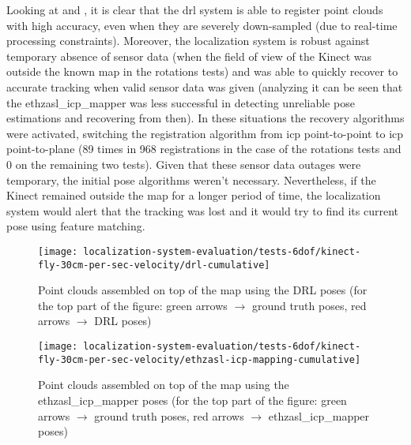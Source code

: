 Looking at  and , it is clear that the \gls{drl} system is able to register point clouds with high accuracy, even when they are severely down-sampled (due to real-time processing constraints). Moreover, the localization system is robust against temporary absence of sensor data (when the field of view of the Kinect was outside the known map in the rotations tests) and was able to quickly recover to accurate tracking when valid sensor data was given (analyzing  it can be seen that the ethzasl\_icp\_mapper was less successful in detecting unreliable pose estimations and recovering from then). In these situations the recovery algorithms were activated, switching the registration algorithm from \gls{icp} point-to-point to \gls{icp} point-to-plane (89 times in 968 registrations in the case of the rotations tests and 0 on the remaining two tests). Given that these sensor data outages were temporary, the initial pose algorithms weren't necessary. Nevertheless, if the Kinect remained outside the map for a longer period of time, the localization system would alert that the tracking was lost and it would try to find its current pose using feature matching.

\begin{figure}[H]
	\centering
	\texttt{[image: localization-system-evaluation/tests-6dof/kinect-fly-30cm-per-sec-velocity/drl-cumulative]}
	\caption{Point clouds assembled on top of the map using the DRL poses (for the top part of the figure: green arrows $\rightarrow$ ground truth poses, red arrows $\rightarrow$ DRL poses)}
	\label{fig:localization-system-evaluation_kinect-fly-30cm-per-sec-velocity-drl-cumulative}
\end{figure}

\begin{figure}[H]
	\centering
	\texttt{[image: localization-system-evaluation/tests-6dof/kinect-fly-30cm-per-sec-velocity/ethzasl-icp-mapping-cumulative]}
	\caption{Point clouds assembled on top of the map using the ethzasl\_icp\_mapper poses (for the top part of the figure: green arrows $\rightarrow$ ground truth poses, red arrows $\rightarrow$ ethzasl\_icp\_mapper poses)}
	\label{fig:localization-system-evaluation_kinect-fly-30cm-per-sec-velocity-ethzasl-icp-mapping-cumulative}
\end{figure}

